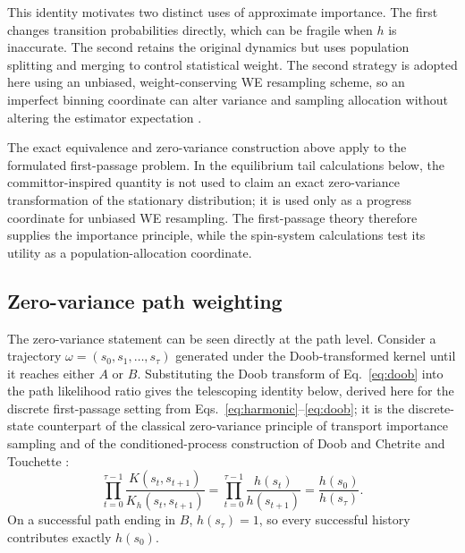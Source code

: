 \documentclass[a4paper,fleqn]{cas-sc}
\begin{document}
This identity motivates two distinct uses of approximate importance. The first changes
transition probabilities directly, which can be fragile when $h$ is inaccurate. The second
retains the original dynamics but uses population splitting and merging to control statistical
weight. The second strategy is adopted here using an unbiased, weight-conserving WE resampling
scheme, so an imperfect binning coordinate can alter variance and sampling allocation without
altering the estimator expectation \citep{zhang2010}.

The exact equivalence and zero-variance construction above apply to the formulated first-passage
problem. In the equilibrium tail calculations below, the committor-inspired quantity is not
used to claim an exact zero-variance transformation of the stationary distribution; it is used
only as a progress coordinate for unbiased WE resampling. The first-passage theory therefore
supplies the importance principle, while the spin-system calculations test its utility as a
population-allocation coordinate.

\subsection{Zero-variance path weighting}\label{sec:zerovar}
The zero-variance statement can be seen directly at the path level. Consider a trajectory
$\omega=(s_0,s_1,\dots,s_\tau)$ generated under the Doob-transformed kernel until it reaches
either $A$ or $B$. Substituting the Doob transform of Eq.~\eqref{eq:doob} into the path
likelihood ratio gives the telescoping identity below, derived here for the discrete
first-passage setting from Eqs.~\eqref{eq:harmonic}--\eqref{eq:doob}; it is the discrete-state
counterpart of the classical zero-variance principle of transport importance sampling
\citep{lewins1965,spanier1969,haghighat2003} and of the conditioned-process construction of
Doob \citep{doob1984} and Chetrite and Touchette \citep{chetrite2015}:
\begin{equation}
\prod_{t=0}^{\tau-1}\frac{K(s_t,s_{t+1})}{K_h(s_t,s_{t+1})}
=\prod_{t=0}^{\tau-1}\frac{h(s_t)}{h(s_{t+1})}
=\frac{h(s_0)}{h(s_\tau)} .
\label{eq:telescope}
\end{equation}
On a successful path ending in $B$, $h(s_\tau)=1$, so every successful history contributes
exactly $h(s_0)$.
\end{document}
